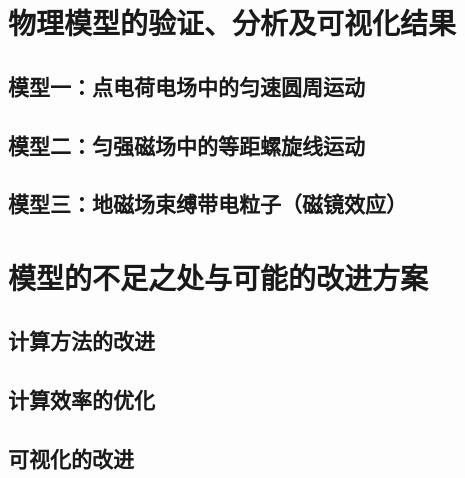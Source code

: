 \documentclass[UTF-8,cs4size]{ctexart}
\begin{document}
\section{物理模型的验证、分析及可视化结果}
\subsection{模型一：点电荷电场中的匀速圆周运动}
\subsection{模型二：匀强磁场中的等距螺旋线运动}
\subsection{模型三：地磁场束缚带电粒子（磁镜效应）}
\section{模型的不足之处与可能的改进方案}
\subsection{计算方法的改进}
\subsection{计算效率的优化}
\subsection{可视化的改进}
\end{document}
